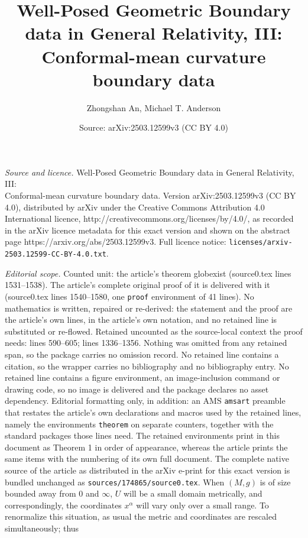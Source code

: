 \documentclass[10pt,a4paper]{amsart}
\title{Well-Posed Geometric Boundary data in General Relativity, III: \\ Conformal-mean curvature boundary data}
\author{Zhongshan An, Michael T. Anderson}
\date{Source: arXiv:2503.12599v3 (CC BY 4.0)}
\renewcommand{\a}{\alpha}
\begin{document}
\maketitle

\noindent\emph{Source and licence.} Well-Posed Geometric Boundary data in General Relativity, III: \\ Conformal-mean curvature boundary data. Version arXiv:2503.12599v3 (CC BY 4.0), distributed by arXiv under the Creative Commons Attribution 4.0 International licence, http://creativecommons.org/licenses/by/4.0/, as recorded in the arXiv licence metadata for this exact version and shown on the abstract page https://arxiv.org/abs/2503.12599v3. Full licence notice: \texttt{licenses/arxiv-2503.12599-CC-BY-4.0.txt}.\par\smallskip

\noindent\textit{Editorial scope.} Counted unit: the article's theorem globexist (source0.tex lines 1531--1538). The article's complete original proof of it is delivered with it (source0.tex lines 1540--1580, one \texttt{proof} environment of 41 lines). No mathematics is written, repaired or re-derived: the statement and the proof are the article's own lines, in the article's own notation, and no retained line is substituted or re-flowed.  Retained uncounted as the source-local context the proof needs: lines 590--605; lines 1336--1356.  Nothing was omitted from any retained span, so the package carries no omission record.  No retained line contains a citation, so the wrapper carries no bibliography and no bibliography entry.  No retained line contains a figure environment, an image-inclusion command or drawing code, so no image is delivered and the package declares no asset dependency.  Editorial formatting only, in addition: an AMS \texttt{amsart} preamble that restates the article's own declarations and macros used by the retained lines, namely the environments \texttt{theorem} on separate counters, together with the standard packages those lines need.  The retained environments print in this document as Theorem 1 in order of appearance, whereas the article prints the same items with the numbering of its own full document.  The complete native source of the article as distributed in the arXiv e-print for this exact version is bundled unchanged as \texttt{sources/174865/source0.tex}.
  When $(M, g)$ is of size bounded away from $0$ and $\infty$, $U$ will be a small domain metrically, and correspondingly, the coordinates 
$x^{\a}$ will vary only over a small range. To renormalize this situation, as usual the metric and coordinates are rescaled simultaneously; thus 
\end{document}

